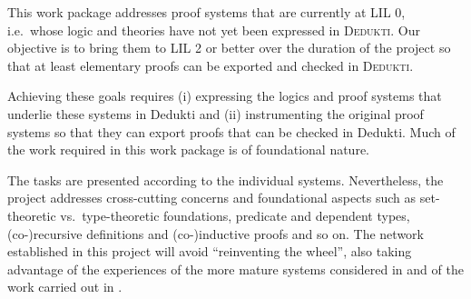 \begin{workpackage}[id=theories,type=RTD,
  short=Theories,%
  title= Theories,
  lead=Inn,
  BiaRM=70,
  BirRM=3,
  IasRM=5,
  InnRM=9,
  InrRM=87,
  LeeRM=3,
  LmuRM=16,
  MedRM=4,
  ProRM=11,
  RunRM=7,
  ]

\begin{wpobjectives}
  This work package addresses proof systems that are currently at LIL 0, i.e.\
  whose logic and theories have not yet been expressed in \textsc{Dedukti}. Our
  objective is to bring them to LIL 2 or better over the duration of the
  project so that at least elementary proofs can be exported and checked in
  \textsc{Dedukti}.

  Achieving these goals requires (i) expressing the logics and proof systems
  that underlie these systems in Dedukti and
  (ii) instrumenting the original proof systems so that they can export proofs
  that can be checked in Dedukti. Much of the work required in this work package
  is of foundational nature.
\end{wpobjectives}
\begin{wpdescription}
  The tasks are presented according to the individual systems. Nevertheless,
  the project addresses cross-cutting concerns and foundational aspects such
  as set-theoretic vs.\ type-theoretic foundations, predicate and dependent
  types, (co-)recursive definitions and (co-)inductive proofs and so on. The
  network established in this project will avoid ``reinventing the wheel'', also
  taking advantage of the experiences of the more mature systems considered in
  \WPref{instrumentation} and of the work carried out in \WPref{atpetc}.
\end{wpdescription}

\begin{tasklist}
%   


\end{tasklist}
\end{workpackage}
